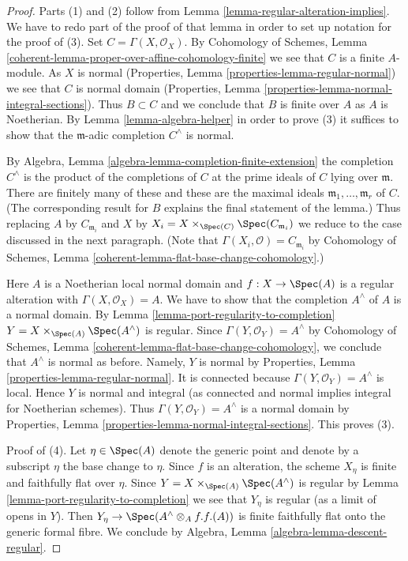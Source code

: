 \begin{proof}
Parts (1) and (2) follow from Lemma \ref{lemma-regular-alteration-implies}.
We have to redo part of the proof of that lemma in order to set up notation
for the proof of (3). Set $C = \Gamma(X, \mathcal{O}_X)$. By
Cohomology of Schemes, Lemma
\ref{coherent-lemma-proper-over-affine-cohomology-finite}
we see that $C$ is a finite $A$-module. As $X$ is normal
(Properties, Lemma \ref{properties-lemma-regular-normal})
we see that $C$ is normal domain
(Properties, Lemma \ref{properties-lemma-normal-integral-sections}).
Thus $B \subset C$ and we conclude that $B$ is finite over $A$
as $A$ is Noetherian. By Lemma \ref{lemma-algebra-helper}
in order to prove (3) it suffices to show
that the $\mathfrak m$-adic completion $C^\wedge$ is normal.

\medskip\noindent
By Algebra, Lemma \ref{algebra-lemma-completion-finite-extension}
the completion $C^\wedge$ is the product of the completions of
$C$ at the prime ideals of $C$ lying over $\mathfrak m$.
There are finitely many of these and these are the maximal
ideals $\mathfrak m_1, \ldots, \mathfrak m_r$ of $C$.
(The corresponding result for $B$ explains the final statement of the lemma.)
Thus replacing $A$ by $C_{\mathfrak m_i}$ and $X$ by
$X_i = X \times_{\Spec(C)} \Spec(C_{\mathfrak m_i})$
we reduce to the case discussed in the next paragraph.
(Note that $\Gamma(X_i, \mathcal{O}) = C_{\mathfrak m_i}$ by
Cohomology of Schemes, Lemma \ref{coherent-lemma-flat-base-change-cohomology}.)

\medskip\noindent
Here $A$ is a Noetherian local normal domain and $f : X \to \Spec(A)$ is a
regular alteration with $\Gamma(X, \mathcal{O}_X) = A$.
We have to show that the completion $A^\wedge$
of $A$ is a normal domain. By
Lemma \ref{lemma-port-regularity-to-completion}
$Y = X \times_{\Spec(A)} \Spec(A^\wedge)$ is regular.
Since $\Gamma(Y, \mathcal{O}_Y) = A^\wedge$ by
Cohomology of Schemes, Lemma \ref{coherent-lemma-flat-base-change-cohomology},
we conclude that $A^\wedge$ is normal as before.
Namely, $Y$ is normal by
Properties, Lemma \ref{properties-lemma-regular-normal}.
It is connected because $\Gamma(Y, \mathcal{O}_Y) = A^\wedge$ is local.
Hence $Y$ is normal and integral (as connected and normal
implies integral for Noetherian schemes). Thus
$\Gamma(Y, \mathcal{O}_Y) = A^\wedge$
is a normal domain by
Properties, Lemma \ref{properties-lemma-normal-integral-sections}.
This proves (3).

\medskip\noindent
Proof of (4). Let $\eta \in \Spec(A)$ denote the generic point
and denote by a subscript $\eta$ the base change to $\eta$.
Since $f$ is an alteration, the scheme $X_\eta$ is finite and
faithfully flat over $\eta$. Since $Y = X \times_{\Spec(A)} \Spec(A^\wedge)$
is regular by Lemma \ref{lemma-port-regularity-to-completion}
we see that $Y_\eta$ is regular (as a limit of opens in $Y$).
Then $Y_\eta \to \Spec(A^\wedge \otimes_A f.f.(A))$ is finite
faithfully flat onto the generic formal fibre. We conclude by
Algebra, Lemma \ref{algebra-lemma-descent-regular}.
\end{proof}
